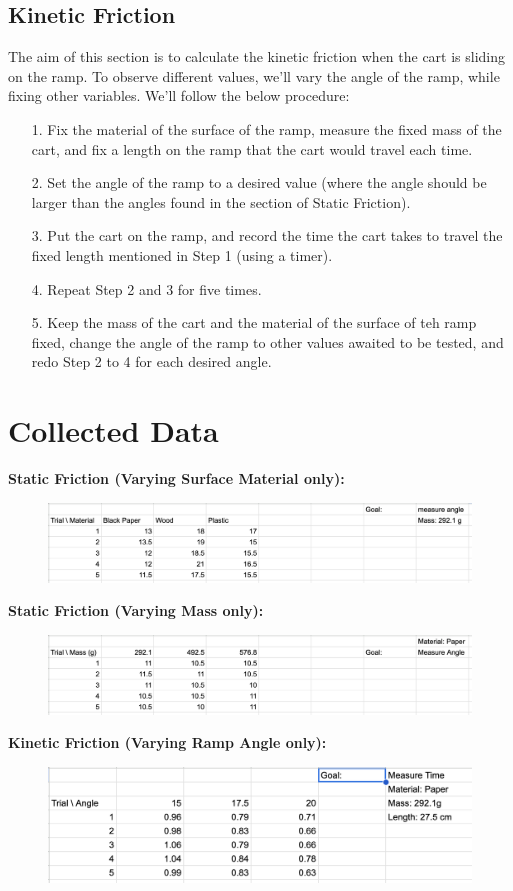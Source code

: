 \documentclass{article}
\begin{document}
\subsection{Kinetic Friction}
The aim of this section is to calculate the kinetic friction when the cart is sliding on the ramp. To observe different values, we'll vary the angle of the ramp, while fixing other variables. We'll follow the below procedure:
\begin{itemize}
    \item[1.] Fix the material of the surface of the ramp, measure the fixed mass of the cart, and fix a length on the ramp that the cart would travel each time.
    \item[2.] Set the angle of the ramp to a desired value (where the angle should be larger than the angles found in the section of Static Friction).
    \item[3.] Put the cart on the ramp, and record the time the cart takes to travel the fixed length mentioned in Step 1 (using a timer).
    \item[4.] Repeat Step 2 and 3 for five times.
    \item[5.] Keep the mass of the cart and the material of the surface of teh ramp fixed, change the angle of the ramp to other values awaited to be tested, and redo Step 2 to 4 for each desired angle. 
\end{itemize}

\section{Collected Data}
\textbf{Static Friction (Varying Surface Material only):}
\begin{figure}[h!]
    \centering
    \includegraphics[width=150mm]{static_surface_data.png}
\end{figure}

\pagebreak

\textbf{Static Friction (Varying Mass only):}

\begin{figure}[h!]
    \centering
    \includegraphics[width=150mm]{static_mass_data.png}
\end{figure}

\hfil

\textbf{Kinetic Friction (Varying Ramp Angle only):}
\begin{figure}[h!]
    \centering
    \includegraphics[width=150mm]{kinetic_data.png}
\end{figure}

\newpage
\end{document}
